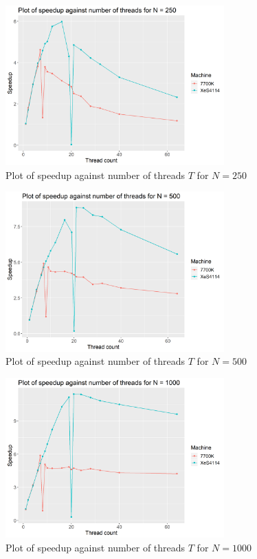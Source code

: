 \documentclass[12pt]{article}
\begin{document}
\begin{figure}[H]
    \centering
    \includegraphics[width=0.75\textwidth]{par-250N-speedup}
    \caption{Plot of speedup against number of threads $T$ for $N = 250$}
    \label{fig:par-250N-speedup}
\end{figure}

\begin{figure}[H]
    \centering
    \includegraphics[width=0.75\textwidth]{par-500N-speedup}
    \caption{Plot of speedup against number of threads $T$ for $N = 500$}
    \label{fig:par-500N-speedup}
\end{figure}

\begin{figure}[H]
    \centering
    \includegraphics[width=0.75\textwidth]{par-1000N-speedup}
    \caption{Plot of speedup against number of threads $T$ for $N = 1000$}
    \label{fig:par-1000N-speedup}
\end{figure}
\end{document}
